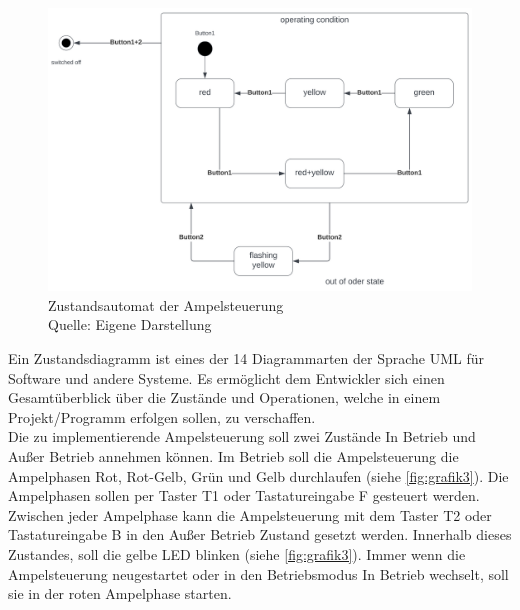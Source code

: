 \begin{figure}[H] 
	\centering
	\includegraphics[width=1.0\textwidth]{images/03.png}
	\caption{Zustandsautomat der Ampelsteuerung \protect \\ Quelle: Eigene Darstellung }
	\label{fig:grafik3}
\end{figure}


Ein Zustandsdiagramm ist eines der 14 Diagrammarten der Sprache UML für Software und andere Systeme. Es ermöglicht dem Entwickler sich einen Gesamtüberblick über die Zustände und Operationen, welche in einem Projekt/Programm erfolgen sollen, zu verschaffen. \\
Die zu implementierende Ampelsteuerung soll zwei Zustände \glqq In Betrieb\grqq{} und \glqq Außer Betrieb\grqq{} annehmen können. Im Betrieb soll die Ampelsteuerung die Ampelphasen Rot, Rot-Gelb, Grün und Gelb durchlaufen (siehe \autoref{fig:grafik3}). Die Ampelphasen sollen per Taster \glqq T1\grqq{} oder Tastatureingabe \glqq F\grqq{} gesteuert werden. Zwischen jeder Ampelphase kann die Ampelsteuerung mit dem Taster \glqq T2\grqq{} oder Tastatureingabe \glqq B\grqq{} in den \glqq Außer Betrieb\grqq{} Zustand gesetzt werden. Innerhalb dieses Zustandes, soll die gelbe LED blinken (siehe \autoref{fig:grafik3}). Immer wenn die Ampelsteuerung neugestartet oder in den Betriebsmodus \glqq In Betrieb\grqq{} wechselt, soll sie in der roten Ampelphase starten.
